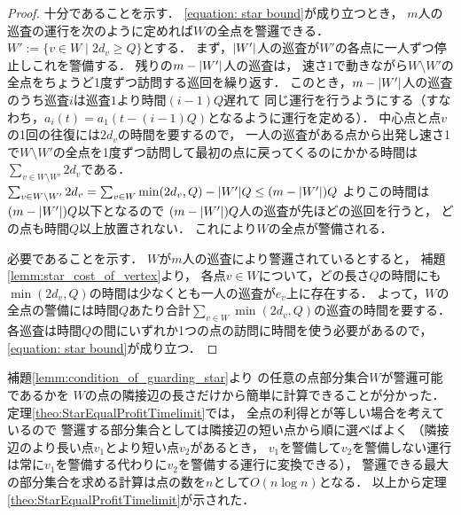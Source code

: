 \begin{proof}
十分であることを示す．
\eqref{equation: star bound}が成り立つとき，
$m$人の巡査の運行を次のように定めれば$W$の全点を警邏できる．
$W' := \{ v \in W \mid 2d_v \geq Q \}$とする．
まず，$\lvert{W'}\rvert$人の巡査が$W'$の各点に一人ずつ停止しこれを警備する．
残りの$m - \lvert{W'}\rvert$人の巡査は，
速さ$1$で動きながら$W \setminus W'$の全点をちょうど1度ずつ訪問する巡回を繰り返す．
このとき，$m - \lvert{W'}\rvert$人の巡査のうち巡査$i$は巡査$1$より時間$(i - 1)Q$遅れて
同じ運行を行うようにする（すなわち，$a_i(t) = a_1(t - (i - 1)Q)$となるように運行を定める）．
中心点と点$v$の1回の往復には$2d_v$の時間を要するので，
一人の巡査がある点から出発し速さ1で$W \setminus W'$の全点を1度ずつ訪問して最初の点に戻ってくるのにかかる時間は$\sum_{v \in W \setminus W'} 2d_v$である．
$\sum_{v \in W \setminus W'} 2d_v
= \sum_{v \in W} \min(2d_v, Q) - |W'|Q
\leq (m - \lvert{W'}\rvert)Q$
よりこの時間は$(m - \lvert{W'}\rvert)Q$以下となるので
$(m - \lvert{W'}\rvert)Q$人の巡査が先ほどの巡回を行うと，
どの点も時間$Q$以上放置されない．
これにより$W$の全点が警備される．

必要であることを示す．
$W$が$m$人の巡査により警邏されているとすると，
補題\ref{lemm:star_cost_of_vertex}より，
各点$v \in W$について，どの長さ$Q$の時間にも
$\min(2d_v, Q)$の時間は少なくとも一人の巡査が$e_v$上に存在する．
よって，$W$の全点の警備には時間$Q$あたり合計$\sum_{v \in W} \min(2d_v, Q)$の巡査の時間を要する．
各巡査は時間$Q$の間にいずれか1つの点の訪問に時間を使う必要があるので，
\eqref{equation: star bound}が成り立つ．
\end{proof}


補題\ref{lemm:condition_of_guarding_star}より
{\graphStar}の任意の点部分集合$W$が警邏可能であるかを
$W$の点の隣接辺の長さだけから簡単に計算できることが分かった．
定理\ref{theo:StarEqualProfitTimelimit}では，
全点の利得と{\maxIdletime}が等しい場合を考えているので
警邏する部分集合としては隣接辺の短い点から順に選べばよく
（隣接辺のより長い点$v_1$とより短い点$v_2$があるとき，
$v_1$を警備して$v_2$を警備しない運行は常に$v_1$を警備する代わりに$v_2$を警備する運行に変換できる），
警邏できる最大の部分集合を求める計算は点の数を$n$として$O(n \log n)$となる．
以上から定理\ref{theo:StarEqualProfitTimelimit}が示された．
